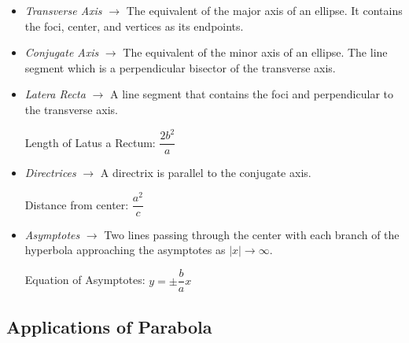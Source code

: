 \documentclass[a4paper]{article}
\theoremstyle{definition}
\begin{document}
\begin{itemize}
     \item \emph{Transverse Axis} $\rightarrow$ The equivalent of the major axis
          of an ellipse. It contains the foci, center, and vertices as its
          endpoints.
     \item \emph{Conjugate Axis} $\rightarrow$ The equivalent of the minor axis
     of an ellipse. The line segment which is a perpendicular bisector of the
     transverse axis.
     \item \emph{Latera Recta} $\rightarrow$ A line segment that contains the
     foci and perpendicular to the transverse axis.
          \begin{center}
                Length of Latus a Rectum: $\dfrac{2b^2}{a}$
          \end{center}
     \item \emph{Directrices} $\rightarrow$ A directrix is parallel to the
     conjugate axis.
          \begin{center}
                Distance from center: $\dfrac{a^2}{c}$
          \end{center}
     \item \emph{Asymptotes} $\rightarrow$ Two lines passing through the center
     with each branch of the hyperbola approaching the asymptotes  as $|x|
     \rightarrow \infty$.
          \begin{center}
                Equation of Asymptotes: $y= \pm \dfrac{b}{a}x$
          \end{center}
\end{itemize}

\newpage
\subsection{Applications of Parabola}
\end{document}
